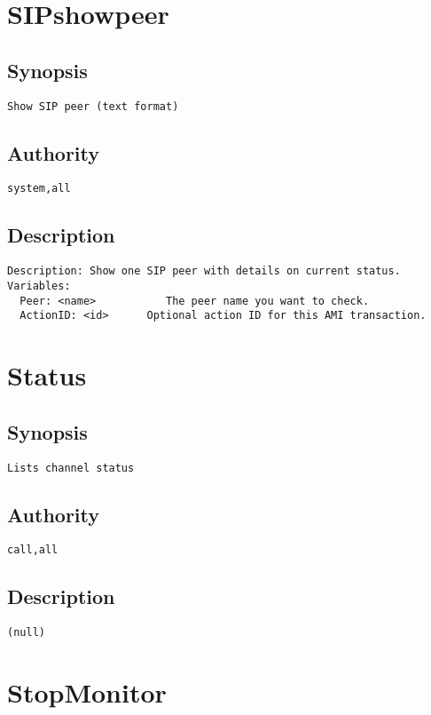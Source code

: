 \section{SIPshowpeer}
\subsection{Synopsis}
\begin{verbatim}
Show SIP peer (text format)
\end{verbatim}
\subsection{Authority}
\begin{verbatim}
system,all
\end{verbatim}
\subsection{Description}
\begin{verbatim}
Description: Show one SIP peer with details on current status.
Variables: 
  Peer: <name>           The peer name you want to check.
  ActionID: <id>	  Optional action ID for this AMI transaction.

\end{verbatim}


\section{Status}
\subsection{Synopsis}
\begin{verbatim}
Lists channel status
\end{verbatim}
\subsection{Authority}
\begin{verbatim}
call,all
\end{verbatim}
\subsection{Description}
\begin{verbatim}
(null)
\end{verbatim}


\section{StopMonitor}
